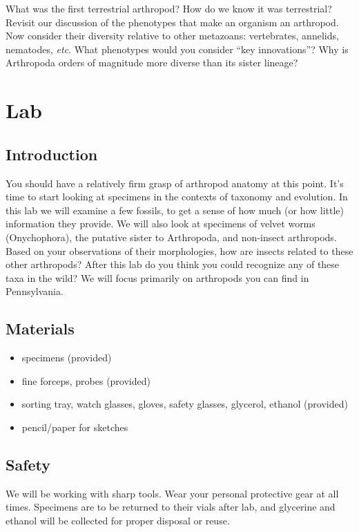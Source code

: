 \documentclass[letterpaper, 11pt]{article}
\begin{document}
\noindent{}What was the first terrestrial arthropod? How do we know it was terrestrial?\\ 

\noindent{}Revisit our discussion of the phenotypes that make an organism an arthropod. Now consider their diversity relative to other metazoans: vertebrates, annelids, nematodes, \textit{etc}. What phenotypes would you consider ``key innovations''? Why is Arthropoda orders of magnitude more diverse than its sister lineage?\\

\section{Lab}

\subsection*{Introduction}
You should have a relatively firm grasp of arthropod anatomy at this point. It's time to start looking at specimens in the contexts of taxonomy and evolution. In this lab we will examine a few fossils, to get a sense of how much (or how little) information they provide. We will also look at specimens of velvet worms (Onychophora), the putative sister to Arthropoda, and non-insect arthropods. Based on your observations of their morphologies, how are insects related to these other arthropods? After this lab do you think you could recognize any of these taxa in the wild? We will focus primarily on arthropods you can find in Pennsylvania. 

\subsection*{Materials}
\begin{itemize}
\item specimens (provided)
\item fine forceps, probes (provided)
\item sorting tray, watch glasses, gloves, safety glasses, glycerol, ethanol (provided)
\item pencil/paper for sketches
\end{itemize}

\subsection*{Safety}
We will be working with sharp tools. Wear your personal protective gear at all times. Specimens are to be returned to their vials after lab, and glycerine and ethanol will be collected for proper disposal or reuse.
\end{document}

